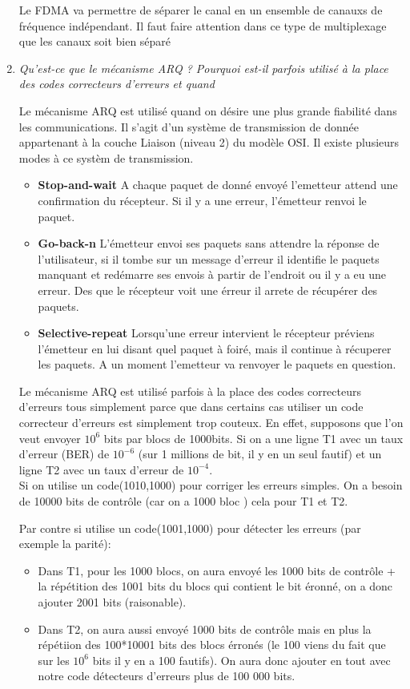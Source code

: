 \documentclass[a4paper, 11pt]{article}
\begin{document}
\begin{enumerate}
Le FDMA va permettre de séparer le canal en un ensemble de canauxs de fréquence indépendant. Il faut faire attention dans ce type de multiplexage que les canaux soit bien séparé

\item \textit{Qu'est-ce que le mécanisme ARQ ? Pourquoi est-il parfois utilisé à la
place des codes correcteurs d'erreurs et quand}

Le mécanisme ARQ est utilisé quand on désire une plus grande fiabilité dans les communications. Il s'agit d'un système de transmission de donnée appartenant à la couche Liaison (niveau 2) du modèle OSI. Il existe plusieurs modes à ce systèm de transmission.
\begin{itemize}
\item \textbf{Stop-and-wait} A chaque paquet de donné envoyé l'emetteur attend une confirmation du récepteur. Si il y a une erreur, l'émetteur renvoi le paquet. 
\item \textbf{Go-back-n} L'émetteur envoi ses paquets sans attendre la réponse de l'utilisateur, si il tombe sur un message d'erreur il identifie le paquets manquant et redémarre ses envois à partir de l'endroit ou il y a eu une erreur. Des que le récepteur voit une érreur il arrete de récupérer des paquets.
\item \textbf{Selective-repeat} Lorsqu'une erreur intervient le récepteur préviens l'émetteur en lui disant quel paquet à foiré, mais il continue à récuperer les paquets. A un moment l'emetteur va renvoyer le paquets en question.
\end{itemize}

Le mécanisme ARQ est utilisé parfois à la place des codes correcteurs d'erreurs tous simplement parce que dans certains cas utiliser un code correcteur d'erreurs est simplement trop couteux. En effet, supposons que l'on veut envoyer $10^6$ bits par
blocs de 1000bits. Si on a une ligne T1 avec un taux d'erreur (BER) de $10^{-6}$ (sur 1 millions de bit, il y en un seul fautif)
et un ligne T2 avec un taux d'erreur de $10^{-4}$. \\
Si on utilise un code(1010,1000) pour corriger les erreurs simples. On a besoin de 10000 bits de contrôle (car on a 1000 bloc )
cela pour T1 et T2.

Par contre si utilise un code(1001,1000) pour détecter les erreurs (par exemple la parité):
\begin{itemize}
\item Dans T1,  pour les 1000 blocs, on aura envoyé les 1000 bits de contrôle + la répétition des 1001 bits du blocs qui contient le bit éronné, on a donc ajouter 2001 bits (raisonable).
\item Dans T2, on aura aussi envoyé 1000 bits de contrôle mais en plus la répétiion des 100*10001 bits des blocs érronés (le 100 viens du fait que sur les $10^6$ bits il y en a 100 fautifs). On aura donc ajouter en tout avec notre code détecteurs d'erreurs plus de 100 000 bits.
\end{itemize}



\end{enumerate}
\end{document}
